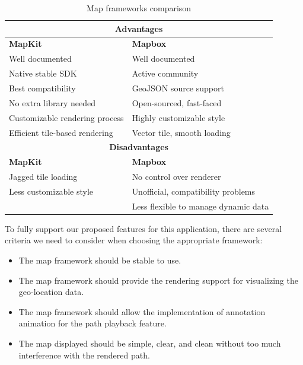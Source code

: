 \documentclass[12pt,a4paper]{article}
\begin{document}
                \begin{table}
                    \begin{tabular}{|p{}|p{}|}
                        \hline
                        \multicolumn{2}{|c|}{\textbf{Advantages}} \\
                        \hline
                        \textbf{MapKit} & \textbf{Mapbox} \\
                        \hline
                        Well documented                 & Well documented\\
                        Native stable SDK               & Active community\\
                        Best compatibility              & GeoJSON source support \\
                        No extra library needed         & Open-sourced, fast-faced \\
                        Customizable rendering process  & Highly customizable style \\
                        Efficient tile-based rendering  & Vector tile, smooth loading \\
                        \hline
                        \hline
                        \multicolumn{2}{|c|}{\textbf{Disadvantages}} \\
                        \hline
                        \textbf{MapKit} & \textbf{Mapbox} \\
                        \hline
                        Jagged tile loading             & No control over renderer \\
                        Less customizable style         & Unofficial, compatibility problems \\
                                                        & Less flexible to manage dynamic data \\
                        \hline
                    \end{tabular}
                    \caption{Map frameworks comparison}
                    \label{table:map-framework-comparison}
                \end{table}
                
                To fully support our proposed features for this application, there are several criteria we need to consider when choosing the appropriate framework:
                \begin{itemize}
                    \setlength\itemsep{-0.5em}
                    \item The map framework should be stable to use.
                    \item The map framework should provide the rendering support for visualizing the geo-location data.
                    \item The map framework should allow the implementation of annotation animation for the path playback feature.
                    \item The map displayed should be simple, clear, and clean without too much interference with the rendered path.
                \end{itemize}
                
\end{document}
